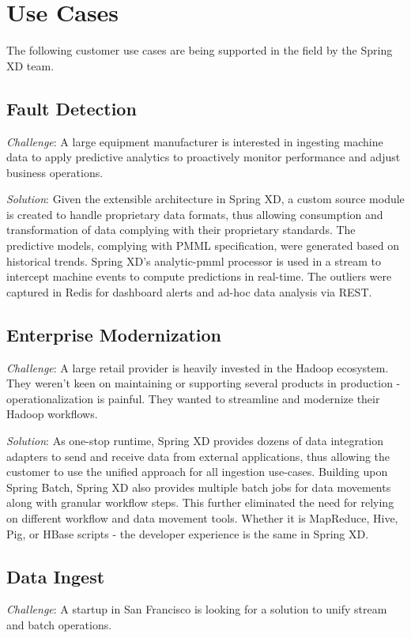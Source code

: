 \section{Use Cases}
\label{sec:Use Cases}

The following customer use cases are being supported in the field by the
Spring XD team.

\subsection{Fault Detection}
\textit{Challenge}: A large equipment manufacturer is interested in
ingesting machine data to apply predictive analytics to proactively monitor
performance and adjust business operations.

\textit{Solution}: Given the extensible architecture in Spring XD, a custom
source module is created to handle proprietary data formats, thus allowing
consumption and transformation of data complying with their proprietary
standards. The predictive models, complying with PMML specification, were
generated based on historical trends. Spring XD's analytic-pmml processor is
used in a stream to intercept machine events to compute predictions in
real-time. The outliers were captured in Redis for dashboard alerts 
and ad-hoc data analysis via REST.

\subsection{Enterprise Modernization}
\textit{Challenge}: A large retail provider is heavily invested in the Hadoop
ecosystem. They weren't keen on maintaining or supporting several products in
production - operationalization is painful. They wanted to streamline and
modernize their Hadoop workflows.

\textit{Solution}: As one-stop runtime, Spring XD provides dozens of data
integration adapters to send and receive data from external applications, thus
allowing the customer to use the unified approach for all ingestion use-cases.
Building upon Spring Batch, Spring XD also provides multiple batch jobs for data movements along with granular workflow steps. This further eliminated the need for relying on different workflow and data movement tools. Whether it is MapReduce, Hive, Pig, or HBase scripts - the developer experience is the same in Spring XD.

\subsection{Data Ingest}
\textit{Challenge}: A startup in San Francisco is looking for a solution to
unify stream and batch operations. 

